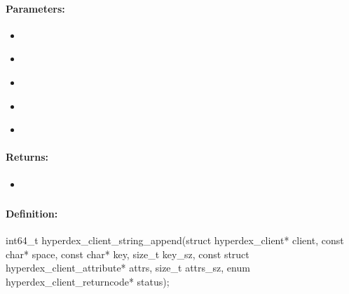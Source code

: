 \paragraph{Parameters:}
\begin{itemize}[noitemsep]
\item {}\\

\item {}\\

\item {}\\

\item {}\\

\item {}\\

\end{itemize}

\paragraph{Returns:}
\begin{itemize}[noitemsep]
\item {}\\

\end{itemize}

\pagebreak
\subsubsection{}
\label{api:c:string_append}


\paragraph{Definition:}
\begin{ccode}
int64_t hyperdex_client_string_append(struct hyperdex_client* client,
        const char* space,
        const char* key, size_t key_sz,
        const struct hyperdex_client_attribute* attrs, size_t attrs_sz,
        enum hyperdex_client_returncode* status);
\end{ccode}

